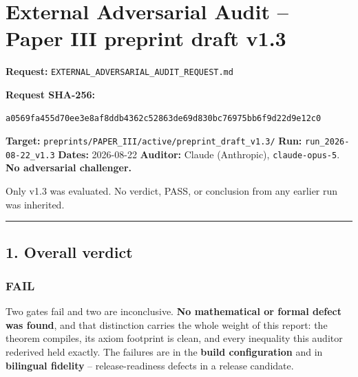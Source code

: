 \documentclass[
  10pt,
]{article}
\author{}
\date{}
\begin{document}
{
\setcounter{tocdepth}{3}
\tableofcontents
}
\section{External Adversarial Audit -- Paper III preprint draft
v1.3}\label{external-adversarial-audit-paper-iii-preprint-draft-v1.3}

\textbf{Request:} \texttt{EXTERNAL\_ADVERSARIAL\_AUDIT\_REQUEST.md}

\textbf{Request SHA-256:}

\begin{verbatim}
a0569fa455d70ee3e8af8ddb4362c52863de69d830bc76975bb6f9d22d9e12c0
\end{verbatim}

\textbf{Target:}
\texttt{preprints/PAPER\_III/active/preprint\_draft\_v1.3/}
\textbf{Run:} \texttt{run\_2026-08-22\_v1.3} \textbf{Dates:} 2026-08-22
\textbf{Auditor:} Claude (Anthropic), \texttt{claude-opus-5}. \textbf{No
adversarial challenger.}

Only v1.3 was evaluated. No verdict, PASS, or conclusion from any
earlier run was inherited.

\begin{center}\rule{0.5\linewidth}{0.5pt}\end{center}

\subsection{1. Overall verdict}\label{overall-verdict}

\subsubsection{FAIL}\label{fail}

Two gates fail and two are inconclusive. \textbf{No mathematical or
formal defect was found}, and that distinction carries the whole weight
of this report: the theorem compiles, its axiom footprint is clean, and
every inequality this auditor rederived held exactly. The failures are
in the \textbf{build configuration} and in \textbf{bilingual fidelity}
-- release-readiness defects in a release candidate.
\end{document}
